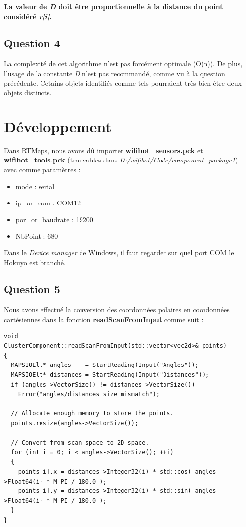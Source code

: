 \textbf{La valeur de \textit{D} doit être proportionnelle à la distance du point considéré \textit{r[i]}.}

\section{Question 4}
La complexité de cet algorithme n'est pas forcément optimale (O(n)). De plus, l'usage de la constante \textit{D} n'est pas recommandé, comme vu à la question précédente. Cetains objets identifiés comme tels pourraient très bien être deux objets distincts.

\chapter{Développement}
\noindent Dans RTMaps, nous avons dû importer \textbf{wifibot\_sensors.pck} et \textbf{wifibot\_tools.pck} (trouvables dans \textit{D:/wifibot/Code/component\_package1}) avec comme paramètres :
\begin{itemize}
  \item mode : serial
  \item ip\_or\_com : COM12
  \item por\_or\_baudrate : 19200
  \item NbPoint : 680
\end{itemize}

\noindent Dans le \textit{Device manager} de Windows, il faut regarder sur quel port COM le Hokuyo est branché.

\section{Question 5}
Nous avons effectué la conversion des coordonnées polaires en coordonnées cartésiennes dans la fonction \textbf{readScanFromInput} comme suit :
\cpp
\begin{lstlisting}
void
ClusterComponent::readScanFromInput(std::vector<vec2d>& points)
{
  MAPSIOElt* angles    = StartReading(Input("Angles"));
  MAPSIOElt* distances = StartReading(Input("Distances"));
  if (angles->VectorSize() != distances->VectorSize())
    Error("angles/distances size mismatch");

  // Allocate enough memory to store the points.
  points.resize(angles->VectorSize());

  // Convert from scan space to 2D space.
  for (int i = 0; i < angles->VectorSize(); ++i)
  {
    points[i].x = distances->Integer32(i) * std::cos( angles->Float64(i) * M_PI / 180.0 );
    points[i].y = distances->Integer32(i) * std::sin( angles->Float64(i) * M_PI / 180.0 );
  }
}
\end{lstlisting}


